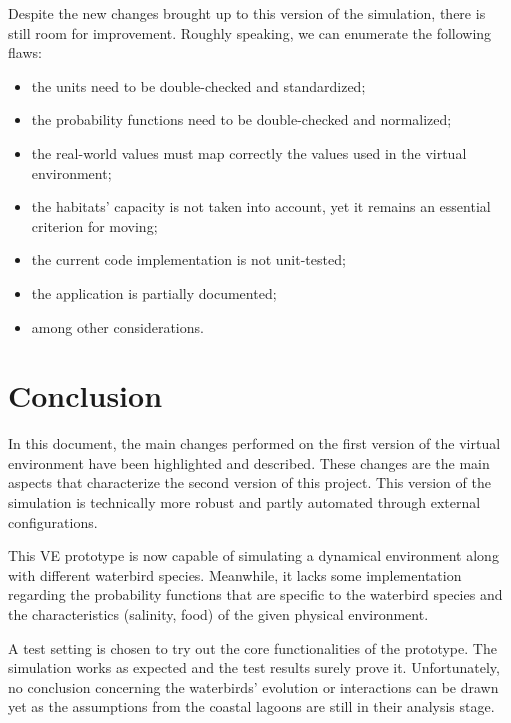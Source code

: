 Despite the new changes brought up to this version of the simulation, there is still room for improvement. Roughly speaking, we can enumerate the following flaws:
\begin{itemize}
    \item the units need to be double-checked and standardized;
    \item the probability functions need to be double-checked and normalized;
    \item the real-world values must map correctly the values used in the virtual environment;
    \item the habitats' capacity is not taken into account, yet it remains an essential criterion for moving;
    \item the current code implementation is not unit-tested;
    \item the application is partially documented;
    \item among other considerations.
\end{itemize}

\clearpage
\newpage
\section{Conclusion}
In this document, the main changes performed on the first version of the virtual environment have been highlighted and described. These changes are the main aspects that characterize the second version of this project. This version of the simulation is technically more robust and partly automated through external configurations.

This VE prototype is now capable of simulating a dynamical environment along with different waterbird species. Meanwhile, it lacks some implementation regarding the probability functions that are specific to the waterbird species and the characteristics (salinity, food) of the given physical environment.

A test setting is chosen to try out the core functionalities of the prototype. The simulation works as expected and the test results surely prove it. Unfortunately, no conclusion concerning the waterbirds' evolution or interactions can be drawn yet as the assumptions from the coastal lagoons are still in their analysis stage.
